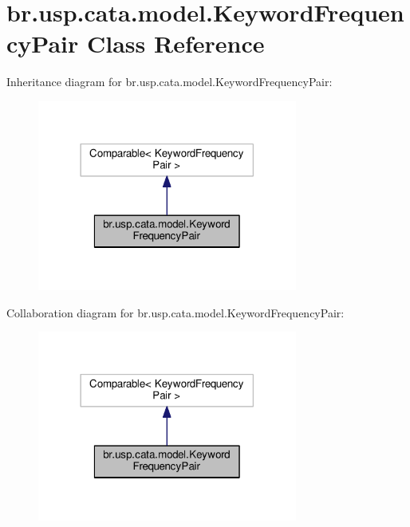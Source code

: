\hypertarget{classbr_1_1usp_1_1cata_1_1model_1_1_keyword_frequency_pair}{\section{br.\+usp.\+cata.\+model.\+Keyword\+Frequency\+Pair Class Reference}
\label{classbr_1_1usp_1_1cata_1_1model_1_1_keyword_frequency_pair}
}


Inheritance diagram for br.\+usp.\+cata.\+model.\+Keyword\+Frequency\+Pair\+:\nopagebreak
\begin{figure}[H]
\begin{center}
\leavevmode
\includegraphics[width=242pt]{classbr_1_1usp_1_1cata_1_1model_1_1_keyword_frequency_pair__inherit__graph}
\end{center}
\end{figure}


Collaboration diagram for br.\+usp.\+cata.\+model.\+Keyword\+Frequency\+Pair\+:\nopagebreak
\begin{figure}[H]
\begin{center}
\leavevmode
\includegraphics[width=242pt]{classbr_1_1usp_1_1cata_1_1model_1_1_keyword_frequency_pair__coll__graph}
\end{center}
\end{figure}
